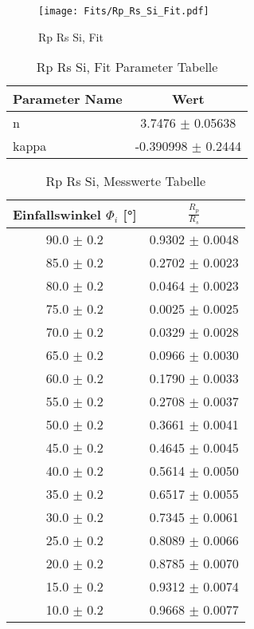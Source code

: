 \begin{figure}[ht] 
 	\centering 
 	\texttt{[image: Fits/Rp\_Rs\_Si\_Fit.pdf]} 
	\caption{Rp Rs Si, Fit} 
 	\label{fig:Rp Rs Si, Fit} 
\end{figure}
 
\begin{table}[ht] 
	\centering 
	\caption{Rp Rs Si, Fit Parameter Tabelle} 
	\label{tab: Rp Rs Si, Fit Parameter Tabelle}
	\begin{tabular}{|l|c|}
		\hline
		Parameter Name	&	Wert \\ \hline
		n	&	 3.7476 $\pm$  0.05638\\ \hline
		kappa	&	-0.390998 $\pm$  0.2444\\ \hline
	\end{tabular} 
\end{table}
 
\begin{table}[ht] 
	\centering 
	\caption{Rp Rs Si, Messwerte Tabelle} 
	\label{tab: Rp Rs Si, Messwerte Tabelle}
	\begin{tabular}{|c|c|}
		\hline
		Einfallswinkel $\Phi_i$ [°] 	&	 $\frac{R_p}{R_s}$\\ \hline
		90.0 $\pm$ 0.2 	&	 0.9302 $\pm$ 0.0048 \\ \hline
		85.0 $\pm$ 0.2 	&	 0.2702 $\pm$ 0.0023 \\ \hline
		80.0 $\pm$ 0.2 	&	 0.0464 $\pm$ 0.0023 \\ \hline
		75.0 $\pm$ 0.2 	&	 0.0025 $\pm$ 0.0025 \\ \hline
		70.0 $\pm$ 0.2 	&	 0.0329 $\pm$ 0.0028 \\ \hline
		65.0 $\pm$ 0.2 	&	 0.0966 $\pm$ 0.0030 \\ \hline
		60.0 $\pm$ 0.2 	&	 0.1790 $\pm$ 0.0033 \\ \hline
		55.0 $\pm$ 0.2 	&	 0.2708 $\pm$ 0.0037 \\ \hline
		50.0 $\pm$ 0.2 	&	 0.3661 $\pm$ 0.0041 \\ \hline
		45.0 $\pm$ 0.2 	&	 0.4645 $\pm$ 0.0045 \\ \hline
		40.0 $\pm$ 0.2 	&	 0.5614 $\pm$ 0.0050 \\ \hline
		35.0 $\pm$ 0.2 	&	 0.6517 $\pm$ 0.0055 \\ \hline
		30.0 $\pm$ 0.2 	&	 0.7345 $\pm$ 0.0061 \\ \hline
		25.0 $\pm$ 0.2 	&	 0.8089 $\pm$ 0.0066 \\ \hline
		20.0 $\pm$ 0.2 	&	 0.8785 $\pm$ 0.0070 \\ \hline
		15.0 $\pm$ 0.2 	&	 0.9312 $\pm$ 0.0074 \\ \hline
		10.0 $\pm$ 0.2 	&	 0.9668 $\pm$ 0.0077 \\ \hline
	\end{tabular} 
\end{table}
 
